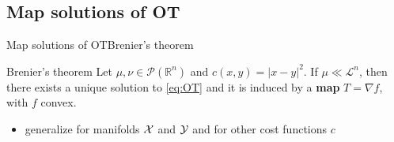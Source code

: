 \documentclass[9pt,xcolor={dvipsnames}]{beamer}
\begin{document}
\subsection{Map solutions of OT}
    \begin{frame}{Map solutions of OT}{Brenier's theorem}
            \begin{block}{Brenier's theorem \cite{brenier1987decomposition}}
                Let $\mu,\nu \in\mathcal{P}(\mathbb{R}^n)$ and \emph{$c(x,y)=|x-y|^{2}$}. If \emph{$\mu\ll \mathcal{L}^n$}, then there exists a unique solution to \cref{eq:OT} and it is induced by a \textbf{map} $T=\nabla f$, with $f$ convex.
            \end{block}
            \vfill
            \begin{itemize}
                \item generalize for manifolds $\mathcal{X}$ and $\mathcal{Y}$ and for other cost functions $c$
            \end{itemize}
\end{frame}
\end{document}
